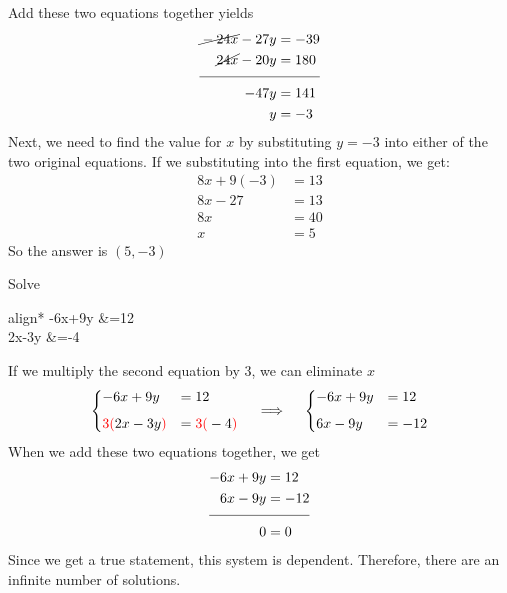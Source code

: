 Add these two equations together yields
\begin{align*}
\cancel{{}-24x} -27y &= -39 \\
\cancel{{}24x} -20y &= 180 \\[-.2cm]
\cline{1-2}
-47y &= 141 \\
y &= -3
\end{align*}
%
Next, we need to find the value for $x$ by substituting $y=-3$ into either of the two original equations. If we substituting into the first equation, we get:
		\begin{align*}
			8x+9(-3) &=	13\\
			8x-27 &= 13\\
			8x &= 40\\
			x &= 5	
		\end{align*}
So the answer is $\displaystyle (5,-3)$
\begin{example}
Solve 
		\begin{empheq}[left={\empheqlbrace}]{align*}
				-6x+9y &=12\\
				2x-3y &=-4	
		\end{empheq}
\end{example}
If we multiply the second equation by $3$, we can eliminate $x$
\[
\begin{dcases}
-6x+9y &=12\\[1ex]
\textcolor{red}{3(}2x-3y\textcolor{red}{)} &=\textcolor{red}{3(}    -4\textcolor{red}{)}	
\end{dcases}
\quad\implies\quad
\begin{dcases}
	-6x+9y &=12 \\[1ex]
	6x-9y &=-12
\end{dcases}
\]
When we add these two equations together, we get
\begin{align*}
-6x+9y &=12 \\
6x-9y &=-12 \\[-.2cm]
\cline{1-2}
    0 &= 0
\end{align*}
%
Since we get a true statement, this system is dependent. Therefore, there are an infinite number of solutions.

